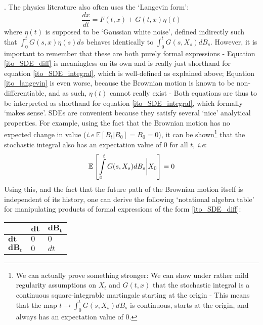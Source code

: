 . The physics literature also often uses the `Langevin form':
\begin{equation}
\label{ito_langevin}
\frac{dx}{dt} = F(t,x) + G(t,x)\eta(t)
\end{equation}
where $\eta(t)$ is supposed to be `Gaussian white noise', defined indirectly such that $\int_0^{t}G(s,x)\eta(s)ds$ behaves identically to $\int_0^{t}G(s,X_s)dB_s$. However, it is important to remember that these are both purely formal expressions - Equation \eqref{ito_SDE_diff} is meaningless on its own and is really just shorthand for equation \eqref{ito_SDE_integral}, which is well-defined as explained above; Equation \eqref{ito_langevin} is even worse, because the Brownian motion is known to be non-differentiable, and as such, $\eta(t)$ cannot really exist - Both equations are thus to be interpreted as shorthand for equation \eqref{ito_SDE_integral}, which formally `makes sense'. SDEs are convenient because they satisfy several `nice' analytical properties. For example, using the fact that the Brownian motion has no expected change in value (\emph{i.e} $\mathbb{E}[B_t | B_0] = B_0 = 0$), it can be shown\footnote{We can actually prove something stronger: We can show under rather mild regularity assumptions on $X_t$ and $G(t,x)$ that the stochastic integral is a continuous square-integrable martingale starting at the origin - This means that the map $t \to \int_0^{t}G(s,X_s)dB_s$ is continuous, starts at the origin, and always has an expectation value of $0$.} that the stochastic integral also has an expectation value of $0$ for all $t$, \emph{i.e}:
\begin{equation*}
\mathbb{E}\left[\int\limits_{0}^{t} G(s,X_s)dB_s \bigg{|} X_0\right] = 0
\end{equation*}
Using this, and the fact that the future path of the Brownian motion itself is independent of its history, one can derive the following `notational algebra table' for manipulating products of formal expressions of the form \eqref{ito_SDE_diff}:
\\
\begin{center}
	\begin{tabularx}{0.4\textwidth}{ 
			| >{\centering\arraybackslash}X 
			| >{\centering\arraybackslash}X 
			| >{\centering\arraybackslash}X | }
		\hline
		& $\mathbf{dt}$ & $\mathbf{dB_t}$ \\
		\hline
		$\mathbf{dt}$ & $0$  &  $0$ \\ 
		\hline
		$\mathbf{dB_t}$ & $0$  & $dt$ \\
		\hline
	\end{tabularx}
\end{center}
